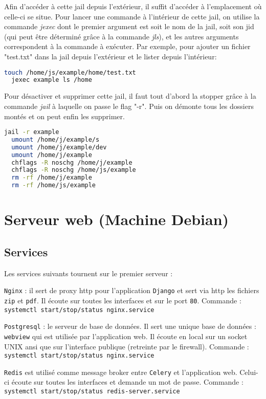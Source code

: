 \documentclass[10pt,a4paper]{article}
\begin{document}
Afin d'accéder à cette jail depuis l'extérieur, il suffit d'accéder à l'emplacement où celle-ci se situe. Pour lancer une commande à l'intérieur de cette jail, on utilise la commande \emph{jexec} dont le premier argument est soit le nom de la jail, soit son jid (qui peut être déterminé grâce à la commande \emph{jls}), et les autres arguments correspondent à la commande à exécuter. Par exemple, pour ajouter un fichier "test.txt" dans la jail depuis l'extérieur et le lister depuis l'intérieur:
\begin{lstlisting}[language=bash]
  touch /home/js/example/home/test.txt
  jexec example ls /home
\end{lstlisting}

Pour désactiver et supprimer cette jail, il faut tout d'abord la stopper grâce à la commande \emph{jail} à laquelle on passe le flag "-r". Puis on démonte tous les dossiers montés et on peut enfin les supprimer.
\begin{lstlisting}[language=bash]
  jail -r example
  umount /home/j/example/s
  umount /home/j/example/dev
  umount /home/j/example
  chflags -R noschg /home/j/example
  chflags -R noschg /home/js/example
  rm -rf /home/j/example
  rm -rf /home/js/example
\end{lstlisting}

\section{Serveur web (Machine Debian)}
\subsection{Services}
Les services suivants tournent sur le premier serveur :

\texttt{Nginx} : il sert de proxy http pour l'application \texttt{Django} et sert via http les fichiers \texttt{zip} et \texttt{pdf}.
Il écoute sur toutes les interfaces et sur le port \texttt{80}.
Commande : \texttt{systemctl start/stop/status nginx.service}

\texttt{Postgresql} : le serveur de base de données.
Il sert une unique base de données : \texttt{webview} qui est utilisée par l'application web.
Il écoute en local sur un socket UNIX ansi que sur l'interface publique (retreinte par le firewall).
Commande : \texttt{systemctl start/stop/status nginx.service}

\texttt{Redis} est utilisé comme message broker entre \texttt{Celery} et l'application web. Celui-ci écoute sur toutes les interfaces et demande un mot de passe.
Commande : \texttt{systemctl start/stop/status redis-server.service}
\end{document}
